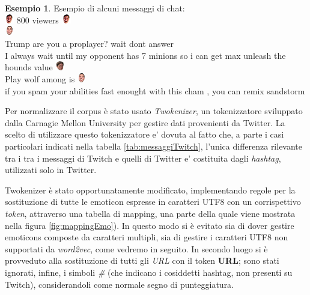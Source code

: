 \documentclass[a4paper,12pt,openright,twoside]{report}
\theoremstyle{definition}
\newtheorem{es}{Esempio}[section]
\begin{document}
\begin{es} Esempio di alcuni messaggi di chat:\\
	\includegraphics[height=0.4cm, width=0.4cm]{Immagini/Emoticons/elegiggle.png} 800 viewers \includegraphics[height=0.4cm, width=0.4cm]{Immagini/Emoticons/elegiggle.png} \\
\includegraphics[height=0.4cm, width=0.4cm]{Immagini/Emoticons/4head.png}\\
Trump are you a proplayer? wait dont answer\\
I always wait until my opponent has 7 minions so i can get max unleash the hounds value \includegraphics[height=0.4cm, width=0.4cm]{Immagini/Emoticons/kappahd.png}\\
Play wolf among is \includegraphics[height=0.4cm, width=0.4cm]{Immagini/Emoticons/4head.png}\\
if you spam your abilities fast enought with this cham , you can remix sandstorm\\
	\label{es:frasi}
\end{es}

Per normalizzare il corpus è stato usato \emph{Twokenizer}, un tokenizzatore sviluppato dalla Carnagie Mellon University
per gestire dati provenienti da Twitter. 
La scelto di utilizzare questo tokenizzatore e' dovuta al fatto che, a parte i casi particolari indicati 
nella tabella
\ref{tab:messaggiTwitch}, l'unica differenza rilevante tra i tra i messaggi di Twitch e
quelli di Twitter e' costituita dagli
\emph{hashtag}, utilizzati solo in Twitter. 

Twokenizer è stato opportunatamente
modificato, implementando regole per la sostituzione di tutte le emoticon espresse in caratteri UTF8 con un corrispettivo \emph{token},
attraverso una tabella di mapping, una parte della quale viene mostrata nella figura \ref{fig:mappingEmo}). In
questo modo si è evitato sia di dover gestire emoticons composte da caratteri multipli, sia di gestire
i caratteri UTF8 non supportati da \emph{word2vec}, come vedremo in seguito.
In secondo luogo si è provveduto alla sostituzione di tutti gli \emph{URL} con il token \textbf{URL};
sono stati ignorati, infine,
i simboli \emph{\#} (che indicano i cosiddetti hashtag, non presenti su Twitch),
considerandoli come normale segno di punteggiatura.
\end{document}
